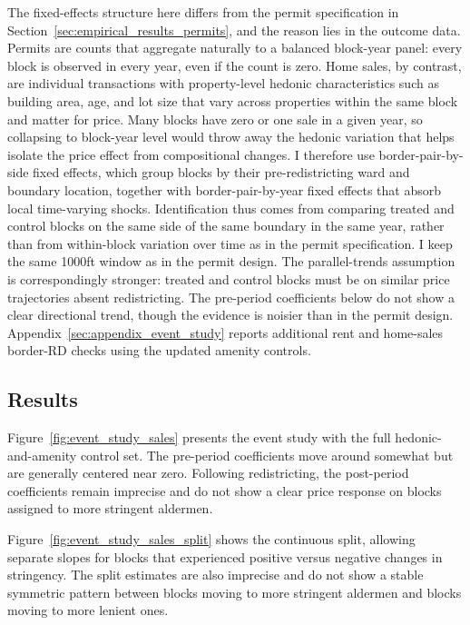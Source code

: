 The fixed-effects structure here differs from the permit specification in Section~\ref{sec:empirical_results_permits}, and the reason lies in the outcome data. Permits are counts that aggregate naturally to a balanced block-year panel: every block is observed in every year, even if the count is zero. Home sales, by contrast, are individual transactions with property-level hedonic characteristics such as building area, age, and lot size that vary across properties within the same block and matter for price. Many blocks have zero or one sale in a given year, so collapsing to block-year level would throw away the hedonic variation that helps isolate the price effect from compositional changes. I therefore use border-pair-by-side fixed effects, which group blocks by their pre-redistricting ward and boundary location, together with border-pair-by-year fixed effects that absorb local time-varying shocks. Identification thus comes from comparing treated and control blocks on the same side of the same boundary in the same year, rather than from within-block variation over time as in the permit specification. I keep the same 1000ft window as in the permit design. The parallel-trends assumption is correspondingly stronger: treated and control blocks must be on similar price trajectories absent redistricting. The pre-period coefficients below do not show a clear directional trend, though the evidence is noisier than in the permit design.
Appendix~\ref{sec:appendix_event_study} reports additional rent and home-sales border-RD checks using the updated amenity controls.

\subsection{Results}

Figure~\ref{fig:event_study_sales} presents the event study with the full hedonic-and-amenity control set. The pre-period coefficients move around somewhat but are generally centered near zero. Following redistricting, the post-period coefficients remain imprecise and do not show a clear price response on blocks assigned to more stringent aldermen.

Figure~\ref{fig:event_study_sales_split} shows the continuous split, allowing separate slopes for blocks that experienced positive versus negative changes in stringency. The split estimates are also imprecise and do not show a stable symmetric pattern between blocks moving to more stringent aldermen and blocks moving to more lenient ones.

